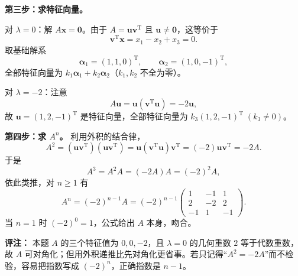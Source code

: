 \textbf{第三步：求特征向量。}

对 \(\lambda=0\)：解 \(A\mathbf{x}=\mathbf{0}\)。由于 \(A=\mathbf{u}\mathbf{v}^{\mathrm{T}}\) 且 \(\mathbf{u}\neq\mathbf{0}\)，这等价于
\[
\mathbf{v}^{\mathrm{T}}\mathbf{x}=x_1-x_2+x_3=0.
\]
取基础解系
\[
\boldsymbol{\alpha}_1=(1,1,0)^{\mathrm{T}},\qquad
\boldsymbol{\alpha}_2=(1,0,-1)^{\mathrm{T}},
\]
全部特征向量为 \(k_1\boldsymbol{\alpha}_1+k_2\boldsymbol{\alpha}_2\)（\(k_1,k_2\) 不全为零）。

对 \(\lambda=-2\)：注意
\[
A\mathbf{u}=\mathbf{u}(\mathbf{v}^{\mathrm{T}}\mathbf{u})=-2\mathbf{u},
\]
故 \(\mathbf{u}=(1,2,-1)^{\mathrm{T}}\) 是特征向量，全部特征向量为 \(k_3(1,2,-1)^{\mathrm{T}}\;(k_3\neq0)\)。

\textbf{第四步：求 \(A^n\)。} 利用外积的结合律，
\[
A^2=(\mathbf{u}\mathbf{v}^{\mathrm{T}})(\mathbf{u}\mathbf{v}^{\mathrm{T}})
=\mathbf{u}(\mathbf{v}^{\mathrm{T}}\mathbf{u})\mathbf{v}^{\mathrm{T}}
=(-2)\mathbf{u}\mathbf{v}^{\mathrm{T}}=-2A.
\]
于是
\[
A^3=A^2A=(-2A)A=(-2)^2A,
\]
依此类推，对 \(n\ge1\) 有
\[
A^n=(-2)^{n-1}A=(-2)^{n-1}
\begin{pmatrix}1&-1&1\\2&-2&2\\-1&1&-1\end{pmatrix}.
\]
当 \(n=1\) 时 \((-2)^0=1\)，公式给出 \(A\) 本身，吻合。

\textbf{评注：} 本题 \(A\) 的三个特征值为 \(0,0,-2\)，且 \(\lambda=0\) 的几何重数 \(2\) 等于代数重数，故 \(A\) 可对角化；但用外积递推比先对角化更省事。若只记得“\(A^2=-2A\)”而不检验，容易把指数写成 \((-2)^n\)，正确指数是 \(n-1\)。

\else \answerarea[10] \fi%
